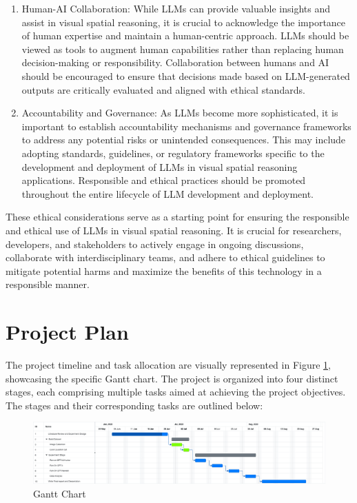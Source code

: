 \documentclass[journal,10pt]{IEEEtran}
\begin{document}
\begin{enumerate}
    \item Human-AI Collaboration: While LLMs can provide valuable insights and assist in visual spatial reasoning, it is crucial to acknowledge the importance of human expertise and maintain a human-centric approach. LLMs should be viewed as tools to augment human capabilities rather than replacing human decision-making or responsibility. Collaboration between humans and AI should be encouraged to ensure that decisions made based on LLM-generated outputs are critically evaluated and aligned with ethical standards.
    \item Accountability and Governance: As LLMs become more sophisticated, it is important to establish accountability mechanisms and governance frameworks to address any potential risks or unintended consequences. This may include adopting standards, guidelines, or regulatory frameworks specific to the development and deployment of LLMs in visual spatial reasoning applications. Responsible and ethical practices should be promoted throughout the entire lifecycle of LLM development and deployment.
\end{enumerate}
These ethical considerations serve as a starting point for ensuring the responsible and ethical use of LLMs in visual spatial reasoning. It is crucial for researchers, developers, and stakeholders to actively engage in ongoing discussions, collaborate with interdisciplinary teams, and adhere to ethical guidelines to mitigate potential harms and maximize the benefits of this technology in a responsible manner.

\section{Project Plan}
The project timeline and task allocation are visually represented in Figure \ref{fig:gantt}, showcasing the specific Gantt chart. The project is organized into four distinct stages, each comprising multiple tasks aimed at achieving the project objectives. The stages and their corresponding tasks are outlined below:

\begin{figure}[htp]
    \centering
    \includegraphics[width=0.8\linewidth]{./pic/Gnatt.png}
    \caption{Gantt Chart}
    \label{fig:gantt}
\end{figure}
\end{document}
